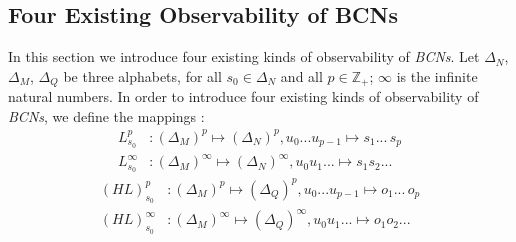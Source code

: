 \documentclass[conference]{IEEEtran} %
\begin{document}
\subsection{Four Existing Observability of BCNs}
In this section we introduce four existing kinds of observability of {\em BCNs}. Let $\Delta_N$, $\Delta_M$, $\Delta_Q$ be three alphabets, for all $s_0\in \Delta_N$ and all $p\in \mathbb{Z}_+$; $\infty$ is the infinite natural numbers. In order to introduce four existing kinds of observability of {\em BCNs}, we define the mappings \cite{Zhang2016Observability}:
\begin{equation}
\begin{split}
L^p_{s_0} &: (\Delta_M)^p\mapsto(\Delta_N)^p, u_0 . . . u_{p-1} \mapsto s_1 . . .\, s_p\\
L^{\infty}_{s_0} &: (\Delta_M)^{\infty}\mapsto(\Delta_N)^{\infty}, u_0 u_1 . . .  \mapsto s_1 s_2 . . .
\end{split}
\end{equation}
\begin{equation}
\begin{split}
(HL)^p_{s_0} &: (\Delta_M)^p\mapsto(\Delta_Q)^p, u_0 . . . u_{p-1} \mapsto o_1 . . .\, o_p\\
(HL)^{\infty}_{s_0} &: (\Delta_M)^{\infty}\mapsto(\Delta_Q)^{\infty}, u_0 u_1 . . .  \mapsto o_1 o_2 . . .
\end{split}
\end{equation}
\end{document}
